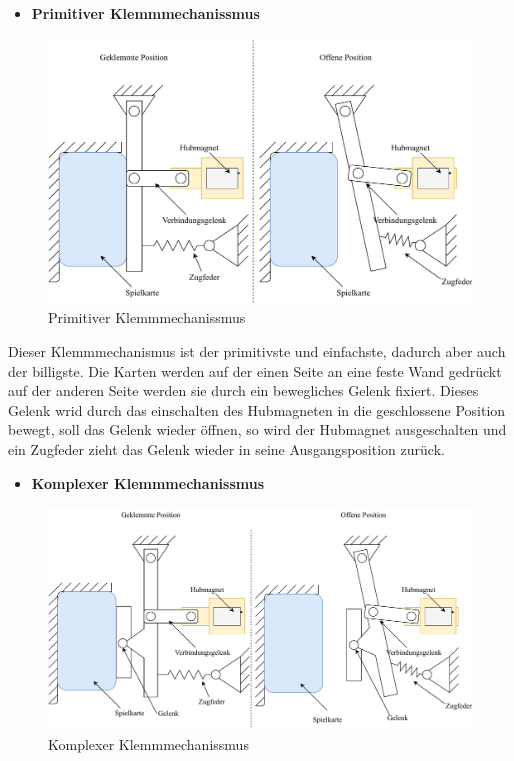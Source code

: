 \begin{itemize}
    \item \textbf{Primitiver Klemmmechanissmus}
\end{itemize}

\begin{figure}[H]
    \centering
    \includegraphics[scale=0.5,page=1]{fig/mech/Klemmmechanissmus1}
    \caption{Primitiver Klemmmechanissmus}
\end{figure}

Dieser Klemmmechanismus ist der primitivste und einfachste, dadurch aber auch der billigste. Die Karten werden auf der einen Seite an eine feste Wand gedrückt
auf der anderen Seite werden sie durch ein bewegliches Gelenk fixiert. Dieses Gelenk wrid durch das einschalten des Hubmagneten in die geschlossene Position bewegt,
soll das Gelenk wieder öffnen, so wird der Hubmagnet ausgeschalten und ein Zugfeder zieht das Gelenk wieder in seine Ausgangsposition zurück.

\begin{itemize}
    \item \textbf{Komplexer Klemmmechanissmus}
\end{itemize}

\begin{figure}[H]
    \centering
    \includegraphics[scale=0.5,page=1]{fig/mech/Klemmmechanissmus2}
    \caption{Komplexer Klemmmechanissmus}
\end{figure}


